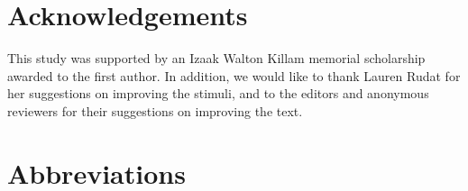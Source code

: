 \documentclass[output=paper
,modfonts
,nonflat]{langsci/langscibook}
\begin{document}








\section*{Acknowledgements}

This study was supported by an Izaak Walton Killam memorial scholarship awarded to the first author. In addition, we would like to thank Lauren Rudat for her suggestions on improving the stimuli, and to the editors and anonymous reviewers for their suggestions on improving the text.

\newpage
\section*{Abbreviations}
\end{document}
